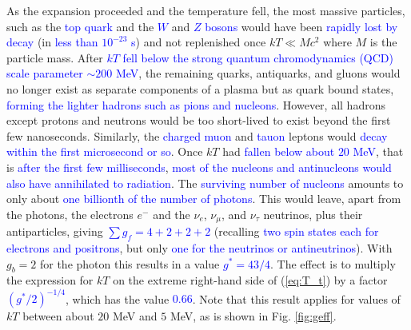 \documentclass[12pt,a4paper]{article}
\begin{document}
As the expansion proceeded and the temperature fell, the most massive particles, such as the \textcolor{blue}{top quark} and the \textcolor{blue}{$W$} and \textcolor{blue}{$Z$ bosons} would have been \textcolor{blue}{rapidly lost by decay} (in \textcolor{blue}{less than $10^{-23}$ s}) and not replenished once $kT \ll Mc^2$ where $M$ is the particle mass. After \textcolor{blue}{$kT$ fell below the strong quantum chromodynamics (QCD) scale parameter $\sim 200$ MeV}, the remaining quarks, antiquarks, and gluons would no longer exist as separate components of a plasma but as quark bound states, \textcolor{blue}{forming the lighter hadrons such as pions and nucleons}. However, all hadrons except protons and neutrons would be too short-lived to exist beyond the first few nanoseconds. Similarly, the \textcolor{blue}{charged muon} and \textcolor{blue}{tauon} leptons would \textcolor{blue}{decay within the first microsecond or so}. Once $kT$ had \textcolor{blue}{fallen below about $20$ MeV}, that is \textcolor{blue}{after the first few milliseconds}, \textcolor{blue}{most of the nucleons and antinucleons would also have annihilated to radiation}. The \textcolor{blue}{surviving number of nucleons} amounts to only about \textcolor{blue}{one billionth of the number of photons}. This would leave, apart from the photons, the electrons $e^-$ and the $\nu_e$, $\nu_\mu$, and $\nu_\tau$ neutrinos, plus their antiparticles, giving \textcolor{blue}{$\sum g_f = 4 + 2 + 2 +2$} (recalling \textcolor{blue}{two spin states each for electrons and positrons}, but only \textcolor{blue}{one for the neutrinos or antineutrinos}). With $g_b = 2$ for the photon this results in a value \textcolor{blue}{$g^\ast = 43/4$}. The effect is to multiply the expression for $kT$ on the extreme right-hand side of (\ref{eq:T_t}) by a factor \textcolor{blue}{$(g^\ast/2)^{-1/4}$}, which has the value \textcolor{blue}{$0.66$}. Note that this result applies for values of $kT$ between about $20$ MeV and $5$ MeV, as is shown in Fig. \ref{fig:geff}. 
\end{document}
